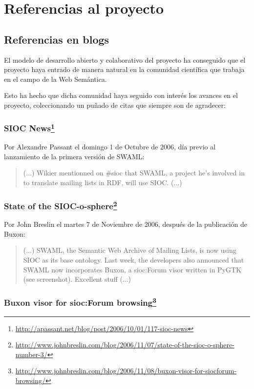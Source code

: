 
\chapter{Referencias al proyecto}

\section{Referencias en blogs}

El modelo de desarrollo abierto y colaborativo del proyecto ha conseguido que el proyecto
haya entrado de manera natural en la comunidad científica que trabaja en el campo de la
Web Semántica.

Esto ha hecho que dicha comunidad haya seguido con interés los avances en el proyecto,
coleccionando un puñado de citas que siempre son de agradecer:

\subsection*{SIOC News\footnote{\url{http://apassant.net/blog/post/2006/10/01/117-sioc-news}}}

Por Alexandre Passant el domingo 1 de Octubre de 2006, día previo al lanzamiento 
de la primera versión de SWAML:

\begin{quote}
 (...) Wikier mentionned on \#sioc that SWAML, a project he's involved in to translate mailing 
 lists in RDF, will use SIOC. (...)
\end{quote}

\subsection*{State of the SIOC-o-sphere\footnote{\url{http://www.johnbreslin.com/blog/2006/11/07/state-of-the-sioc-o-sphere-number-3/}}}

Por John Breslin el martes 7 de Noviembre de 2006, después de la publicación de Buxon:

\begin{quote}
 (...) SWAML, the Semantic Web Archive of Mailing Lists, is now using SIOC as its base 
 ontology. Last week, the developers also announced that SWAML now incorporates Buxon, a sioc:Forum 
 visor written in PyGTK (see screenshot). Excellent stuff  (...)
\end{quote}

\subsection*{Buxon visor for sioc:Forum browsing\footnote{\url{http://www.johnbreslin.com/blog/2006/11/08/buxon-visor-for-siocforum-browsing/}}}

